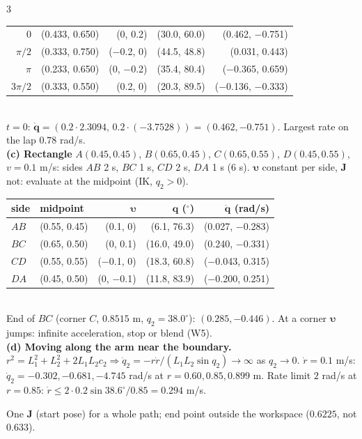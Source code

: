 \begin{multicols}{3}
{\begin{tabular}{@{}rrrrr@{}}
0&(0.433, 0.650)&(0, 0.2)&(30.0, 60.0)&(0.462, $-$0.751)\\
$\pi/2$&(0.333, 0.750)&($-$0.2, 0)&(44.5, 48.8)&(0.031, 0.443)\\
$\pi$&(0.233, 0.650)&(0, $-$0.2)&(35.4, 80.4)&($-$0.365, 0.659)\\
$3\pi/2$&(0.333, 0.550)&(0.2, 0)&(20.3, 89.5)&($-$0.136, $-$0.333)\\\bottomrule\end{tabular}}\\
$t=0$: $\dot{\mathbf q}=(0.2\cdot2.3094,\,0.2\cdot(-3.7528))=(0.462,-0.751)$. Largest rate on the lap $0.78$ rad/s. \chk\\
\textbf{(c) Rectangle} $A(0.45,0.45)$, $B(0.65,0.45)$, $C(0.65,0.55)$, $D(0.45,0.55)$, $v=0.1$ m/s: sides $AB$ 2 s, $BC$ 1 s, $CD$ 2 s, $DA$ 1 s (6 s). $\boldsymbol\upsilon$ constant per side, $\mathbf J$ not: evaluate at the midpoint (IK, $q_2>0$).\\
{\small\begin{tabular}{@{}llrrr@{}}\toprule side&midpoint&$\boldsymbol\upsilon$&$\mathbf q$ ($^\circ$)&$\dot{\mathbf q}$ (rad/s)\\\midrule
$AB$&(0.55, 0.45)&(0.1, 0)&(6.1, 76.3)&(0.027, $-$0.283)\\
$BC$&(0.65, 0.50)&(0, 0.1)&(16.0, 49.0)&(0.240, $-$0.331)\\
$CD$&(0.55, 0.55)&($-$0.1, 0)&(18.3, 60.8)&($-$0.043, 0.315)\\
$DA$&(0.45, 0.50)&(0, $-$0.1)&(11.8, 83.9)&($-$0.200, 0.251)\\\bottomrule\end{tabular}}\\
End of $BC$ (corner $C$, $0.8515$ m, $q_2=38.0^\circ$): $(0.285,-0.446)$. At a corner $\boldsymbol\upsilon$ jumps: infinite acceleration, stop or blend (W5). \chk\\
\textbf{(d) Moving along the arm near the boundary.} $r^2=L_1^2+L_2^2+2L_1L_2c_2\Rightarrow\dot q_2=-r\dot r/(L_1L_2\sin q_2)\to\infty$ as $q_2\to0$. $\dot r=0.1$ m/s: $\dot q_2=-0.302,-0.681,-4.745$ rad/s at $r=0.60,0.85,0.899$ m. Rate limit $2$ rad/s at $r=0.85$: $\dot r\le2\cdot0.2\sin38.6^\circ/0.85=0.294$ m/s. \chk
\begin{trap}
One $\mathbf J$ (start pose) for a whole path; end point outside the workspace ($0.6225$, not $0.633$).
\end{trap}


\end{multicols}
